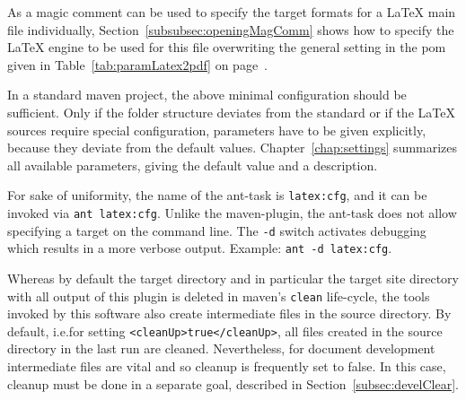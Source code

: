 As a magic comment can be used 
to specify the target formats for a \LaTeX{} main file individually, 
Section~\ref{subsubsec:openingMagComm} shows 
how to specify the \LaTeX{} engine to be used for this file 
overwriting the general setting  in the pom 
given in Table~\ref{tab:paramLatex2pdf} on page~\pageref{tab:paramLatex2pdf}. 




% 



In a standard maven project, 
the above minimal configuration should be sufficient. 
Only if the folder structure deviates from the standard 
or if the \LaTeX{} sources require special configuration, 
parameters have to be given explicitly, 
because they deviate from the default values. 
Chapter~\ref{chap:settings} summarizes all available parameters, 
giving the default value and a description. 


For sake of uniformity, 
the name of the ant-task is \texttt{latex:cfg}, 
and it can be invoked via \texttt{ant latex:cfg}. 
Unlike the maven-plugin, the ant-task 
does not allow specifying a target on the command line. 
The \texttt{-d} switch activates debugging 
which results in a more verbose output. 
Example: \texttt{ant -d latex:cfg}. 

Whereas by default the target directory and in particular 
the target site directory with all output of this plugin is deleted 
in maven's \texttt{clean} life-cycle, 
the tools invoked by this software also create intermediate files 
in the source directory. 
By default, i.e.\@ for setting \texttt{<cleanUp>true</cleanUp>}, 
all files created in the source directory in the last run are cleaned. 
Nevertheless, for document development intermediate files are vital 
and so cleanup is frequently set to false. 
In this case, cleanup must be done in a separate goal, 
described in Section~\ref{subsec:develClear}. 

